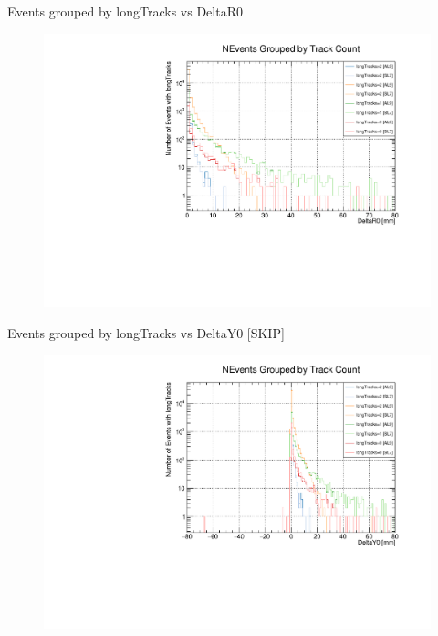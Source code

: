\begin{frame}{Events grouped by longTracks vs DeltaR0 }
    \begin{figure}
        \includegraphics[width=\linewidth]{./output/Effi_DeltaR0_all.pdf}
    \end{figure}
\end{frame}

\begin{frame}{Events grouped by longTracks vs DeltaY0 [SKIP]}
    \begin{figure}
        \includegraphics[width=\linewidth]{./output/Effi_DeltaY0_all.pdf}
    \end{figure}
\end{frame}

